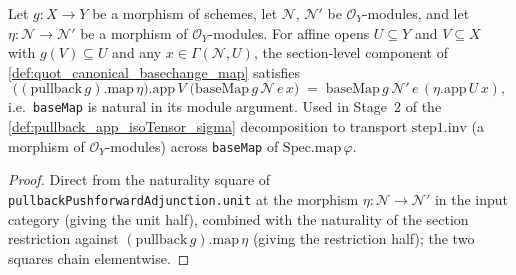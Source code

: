 \begin{lemma}
  \label{lem:baseMap_pullbackComp_apply}
  \leanok
  Let \(g : X \to Y\) be a morphism of schemes, let \(\mathcal N\),
  \(\mathcal N'\) be \(\mathcal O_Y\)-modules, and let
  \(\eta : \mathcal N \to \mathcal N'\) be a morphism of
  \(\mathcal O_Y\)-modules. For affine opens \(U \subseteq Y\) and
  \(V \subseteq X\) with \(g(V) \subseteq U\) and any
  \(x \in \Gamma(\mathcal N, U)\), the section-level component of
  \cref{def:quot_canonical_basechange_map} satisfies
  \[
    \bigl((\text{pullback}\,g).\mathrm{map}\,\eta\bigr).\mathrm{app}\,V\;
    \bigl(\text{baseMap}\,g\,\mathcal N\,e\,x\bigr)
    \;=\;
    \text{baseMap}\,g\,\mathcal N'\,e\,(\eta.\mathrm{app}\,U\,x),
  \]
  i.e.\ \texttt{baseMap} is natural in its module argument. Used in
  Stage~2 of the \cref{def:pullback_app_isoTensor_sigma}
  decomposition to transport \(\text{step1}.\mathrm{inv}\) (a
  morphism of \(\mathcal O_Y\)-modules) across \texttt{baseMap} of
  \(\text{Spec.map}\,\varphi\).
\end{lemma}
\begin{proof}
  \leanok
  Direct from the naturality square of
  \texttt{pullbackPushforwardAdjunction.unit} at the morphism
  \(\eta : \mathcal N \to \mathcal N'\) in the input category
  (giving the unit half), combined with the naturality of the
  section restriction against \((\text{pullback}\,g).\mathrm{map}\,\eta\)
  (giving the restriction half); the two squares chain elementwise.
\end{proof}

